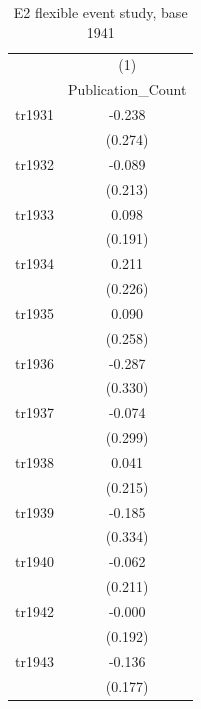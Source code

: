\begin{table}[htbp]\centering
\def\sym#1{\ifmmode^{#1}\else\(^{#1}\)\fi}
\caption{E2 flexible event study, base 1941}
\begin{tabular}{l*{1}{c}}
\toprule
                    &\multicolumn{1}{c}{(1)}\\
                    &\multicolumn{1}{c}{Publication\_Count}\\
\midrule
tr1931              &      -0.238         \\
                    &     (0.274)         \\
\addlinespace
tr1932              &      -0.089         \\
                    &     (0.213)         \\
\addlinespace
tr1933              &       0.098         \\
                    &     (0.191)         \\
\addlinespace
tr1934              &       0.211         \\
                    &     (0.226)         \\
\addlinespace
tr1935              &       0.090         \\
                    &     (0.258)         \\
\addlinespace
tr1936              &      -0.287         \\
                    &     (0.330)         \\
\addlinespace
tr1937              &      -0.074         \\
                    &     (0.299)         \\
\addlinespace
tr1938              &       0.041         \\
                    &     (0.215)         \\
\addlinespace
tr1939              &      -0.185         \\
                    &     (0.334)         \\
\addlinespace
tr1940              &      -0.062         \\
                    &     (0.211)         \\
\addlinespace
tr1942              &      -0.000         \\
                    &     (0.192)         \\
\addlinespace
tr1943              &      -0.136         \\
                    &     (0.177)         \\

\end{tabular}
\end{table}
